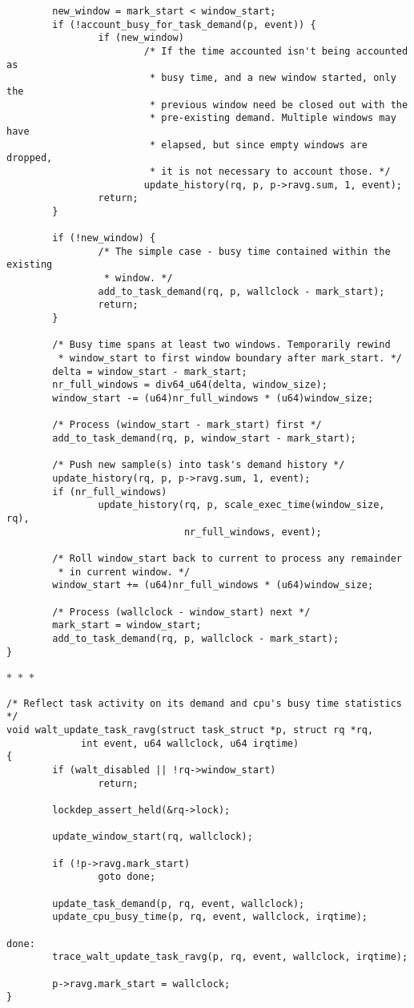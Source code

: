 \documentclass{article}
\newcommand{\divider}{{\begin{center}
  $\ast$~$\ast$~$\ast$
\end{center}}}
\begin{document}
\begin{verbatim}
        new_window = mark_start < window_start;
        if (!account_busy_for_task_demand(p, event)) {
                if (new_window)
                        /* If the time accounted isn't being accounted as
                         * busy time, and a new window started, only the
                         * previous window need be closed out with the
                         * pre-existing demand. Multiple windows may have
                         * elapsed, but since empty windows are dropped,
                         * it is not necessary to account those. */
                        update_history(rq, p, p->ravg.sum, 1, event);
                return;
        }

        if (!new_window) {
                /* The simple case - busy time contained within the existing
                 * window. */
                add_to_task_demand(rq, p, wallclock - mark_start);
                return;
        }

        /* Busy time spans at least two windows. Temporarily rewind
         * window_start to first window boundary after mark_start. */
        delta = window_start - mark_start;
        nr_full_windows = div64_u64(delta, window_size);
        window_start -= (u64)nr_full_windows * (u64)window_size;

        /* Process (window_start - mark_start) first */
        add_to_task_demand(rq, p, window_start - mark_start);

        /* Push new sample(s) into task's demand history */
        update_history(rq, p, p->ravg.sum, 1, event);
        if (nr_full_windows)
                update_history(rq, p, scale_exec_time(window_size, rq),
                               nr_full_windows, event);

        /* Roll window_start back to current to process any remainder
         * in current window. */
        window_start += (u64)nr_full_windows * (u64)window_size;

        /* Process (wallclock - window_start) next */
        mark_start = window_start;
        add_to_task_demand(rq, p, wallclock - mark_start);
}
\end{verbatim}
\divider
\begin{verbatim}
/* Reflect task activity on its demand and cpu's busy time statistics */
void walt_update_task_ravg(struct task_struct *p, struct rq *rq,
             int event, u64 wallclock, u64 irqtime)
{
        if (walt_disabled || !rq->window_start)
                return;

        lockdep_assert_held(&rq->lock);

        update_window_start(rq, wallclock);

        if (!p->ravg.mark_start)
                goto done;
                
        update_task_demand(p, rq, event, wallclock);
        update_cpu_busy_time(p, rq, event, wallclock, irqtime);

done:
        trace_walt_update_task_ravg(p, rq, event, wallclock, irqtime);

        p->ravg.mark_start = wallclock;
}
\end{verbatim}
\end{document}
